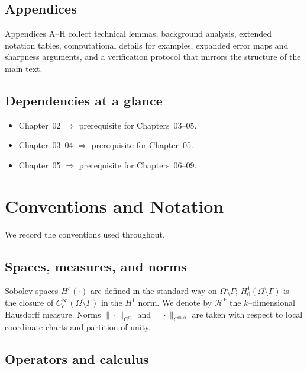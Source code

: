 \subsection{Appendices}
\label{sub:intro-appendices}

Appendices A–H collect technical lemmas, background analysis, extended
notation tables, computational details for examples, expanded error maps and
sharpness arguments, and a verification protocol that mirrors the structure
of the main text.

\subsection{Dependencies at a glance}
\label{sub:intro-dependencies}

\begin{itemize}
  \item Chapter~02 $\Rightarrow$ prerequisite for Chapters~03–05.
  \item Chapter~03–04 $\Rightarrow$ prerequisite for Chapter~05.
  \item Chapter~05 $\Rightarrow$ prerequisite for Chapters~06–09.
\end{itemize}


\section{Conventions and Notation}
\label{sec:intro-notation}

We record the conventions used throughout.

\subsection{Spaces, measures, and norms}
\label{sub:intro-spaces}

Sobolev spaces $H^s(\cdot)$ are defined in the standard way on
$\Omega\setminus\Gamma$; $H^1_0(\Omega\setminus\Gamma)$ is the closure of
$C_c^\infty(\Omega\setminus\Gamma)$ in the $H^1$ norm. We denote by
$\mathcal{H}^{k}$ the $k$–dimensional Hausdorff measure. Norms
$\|\cdot\|_{C^m}$ and $\|\cdot\|_{C^{m,\alpha}}$ are taken with respect to
local coordinate charts and partition of unity.

\subsection{Operators and calculus}
\label{sub:intro-operators-notation}

